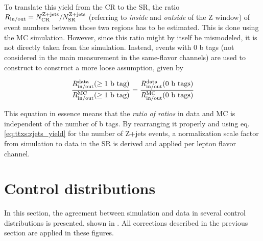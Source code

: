 To translate this yield from the CR to the SR, the ratio $R_{\mathrm{in/out}} = N_{\mathrm{CR}}^{\mathrm{Z+jets}} / N_{\mathrm{SR}}^{\mathrm{Z+jets}}$ (referring to \textit{inside} and \textit{outside} of the Z window) of event numbers between those two regions has to be estimated. This is done using the MC simulation. However, since this ratio might by itself be mismodeled, it is not directly taken from the simulation. Instead, events with 0 b tags (not considered in the main measurement in the same-flavor channels) are used to construct to construct a more loose assumption, given by

\begin{equation}
    \frac{  R_{\mathrm{in/out}}^{\text{data}} ( \geq \text{1 b tag} ) } { R_{\mathrm{in/out}}^{\text{MC}} ( \geq \text{1 b tag} ) } = \frac{  R_{\mathrm{in/out}}^{\text{data}} ( \text{0 b tags} ) } { R_{\mathrm{in/out}}^{\text{MC}} ( \text{0 b tags} ) }
\end{equation}

This equation in essence means that the \textit{ratio of ratios} in data and MC is independent of the number of b tags. By rearranging it properly and using eq. \ref{eq:ttxs:zjets_yield} for the number of Z+jets events, a normalization scale factor from simulation to data in the SR is derived and applied per lepton flavor channel.

\section{Control distributions}
\label{sec:ttxs:control}

In this section, the agreement between simulation and data in several control distributions is presented, shown in . All corrections described in the previous section are applied in these figures.

